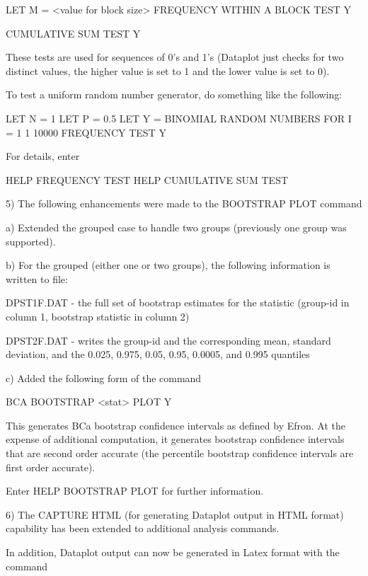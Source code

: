 {          LET M = <value for block size>
          FREQUENCY WITHIN A BLOCK TEST Y

          CUMULATIVE SUM TEST Y

       These tests are used for sequences of 0's and 1's (Dataplot
       just checks for two distinct values, the higher value is
       set to 1 and the lower value is set to 0).

       To test a uniform random number generator, do something like
       the following:

          LET N = 1
          LET P = 0.5
          LET Y = BINOMIAL RANDOM NUMBERS FOR I = 1 1 10000
          FREQUENCY TEST Y

       For details, enter

          HELP FREQUENCY TEST
          HELP CUMULATIVE SUM TEST

 5) The following enhancements were made to the BOOTSTRAP PLOT command

    a) Extended the grouped case to handle two groups (previously
       one group was supported).

    b) For the grouped (either one or two groups), the following
       information is written to file:

       DPST1F.DAT - the full set of bootstrap estimates for the
                    statistic (group-id in column 1, bootstrap
                    statistic in column 2)

       DPST2F.DAT - writes the group-id and the corresponding mean,
                    standard deviation, and the 0.025, 0.975, 0.05,
                    0.95, 0.0005, and 0.995 quantiles

    c) Added the following form of the command

          BCA BOOTSTRAP <stat> PLOT Y

       This generates BCa bootstrap confidence intervals as defined
       by Efron.  At the expense of additional computation, it
       generates bootstrap confidence intervals that are second order
       accurate (the percentile bootstrap confidence intervals are
       first order accurate).

       Enter HELP BOOTSTRAP PLOT for further information.

 6) The CAPTURE HTML (for generating Dataplot output in HTML format)
    capability has been extended to additional analysis commands.

    In addition, Dataplot output can now be generated in Latex format
    with the command

}
